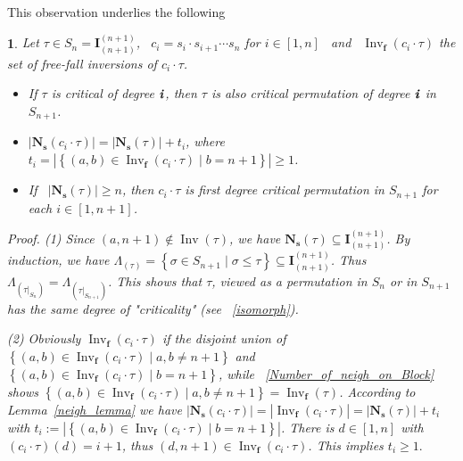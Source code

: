 \documentclass[a4 paper,12pt]{article}
\newcommand{\ma}{\leqslant}
\DeclareMathOperator{\Inv}{Inv}
\newtheorem{subnum}{}[numeris]
\begin{document}
This observation underlies the following 










\begin{subnum} \textit{Let $\tau \in S_{n} = \textbf{I}_{(n+1)}^{(n+1)}$,  \  $c_i= s_{i}\cdot s_{i+1}\cdots s_{n}$ for $i\in \left[1,n\right]$ \  and \  $\Inv_{\textbf{f}}(c_i\cdot \tau)$ the set of free-fall inversions of $c_i\cdot \tau$.}

\begin{itemize}
\item[(1)]\textit{If  $\tau$ is critical  of degree $\textbf{\textit{i}}$, then $\tau$ is also critical permutation of degree $\textbf{\textit{i}}$  in $S_{n+1}$.}
	\item[(2)] \textit{$\left|\textbf{N}_{\textbf{s}}(c_i\cdot \tau)\right| =  \left|\textbf{N}_{\textbf{s}}( \tau)\right| +t_i$,  where $t_i= \left|\left\{(a,b)\in \Inv_{\textbf{f}}(c_i\cdot \tau) \mid  b=n+1\right\}\right| \geq 1$.}
	\item[(3)] \textit{If  \ $\left|\textbf{N}_{\textbf{s}}( \tau)\right|\geq n$, then $c_i\cdot  \tau$ is first degree critical permutation in $S_{n+1}$ for each $i\in \left[1,n+1\right]$.}
\end{itemize}


\textit{Proof.} (1)  Since $(a,n+1)\not\in \Inv(\tau)$, we have $\textbf{N}_{\textbf{s}}( \tau)\subseteq \textbf{I}_{(n+1)}^{(n+1)}$. By induction, we have  $\Lambda_{(\tau)} = \left\{\sigma \in S_{n+1}\mid \sigma\ma \tau\right\}\subseteq \textbf{I}_{(n+1)}^{(n+1)}$.   Thus  $\Lambda_{(\tau|_{S_n})} =\Lambda_{(\tau|_{S_{n+1}})}$. This shows that $\tau$, viewed as a permutation in  $S_{n}$ or in  $S_{n+1}$ has the same degree of "\textit{criticality}" (see ~\ref{isomorph}). 



 (2) Obviously  $\Inv_{\textbf{f}}(c_i\cdot \tau) $ if the disjoint union of  $ \left\{(a,b)\in \Inv_{\textbf{f}}(c_i\cdot \tau) \mid a,b\neq n+1\right\} $ and  $ \left\{(a,b)\in \Inv_{\textbf{f}}(c_i\cdot \tau) \mid b= n+1\right\}$, while ~\ref{Number_of_neigh_on_Block} shows $ \left\{(a,b)\in \Inv_{\textbf{f}}(c_i\cdot \tau) \mid a,b\neq n+1\right\} =  \Inv_{\textbf{f}}(\tau)$. According to Lemma~\ref{neigh_lemma} we have $\left|\textbf{N}_{\textbf{s}}(c_i\cdot \tau)\right| = \left|\Inv_{\textbf{f}}(c_i\cdot \tau)\right| =  \left|\textbf{N}_{\textbf{s}}( \tau)\right| +t_i$ with $t_i :=\left|\left\{(a,b)\in \Inv_{\textbf{f}}(c_i\cdot \tau) \mid b= n+1\right\}\right|$. There is $d\in \left[1,n\right]$ with $(c_i\cdot \tau)(d) = i+1$, 
thus $(d,n+1)\in \Inv_{\textbf{f}}(c_i\cdot \tau) $. This implies $t_i\geq 1.$







\end{subnum}
\end{document}
